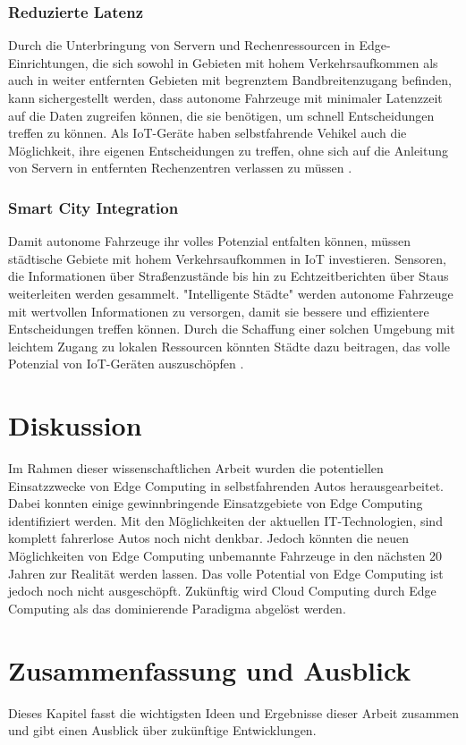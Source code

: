\documentclass{sigchi}
\begin{document}
\subsubsection{Reduzierte Latenz}
Durch die Unterbringung von Servern und Rechenressourcen in Edge-Einrichtungen, die sich sowohl in Gebieten mit hohem Verkehrsaufkommen als auch in weiter entfernten Gebieten mit begrenztem Bandbreitenzugang befinden, kann sichergestellt werden, dass autonome Fahrzeuge mit minimaler Latenzzeit auf die Daten zugreifen können, die sie benötigen, um schnell Entscheidungen treffen zu können. Als IoT-Geräte haben selbstfahrende Vehikel auch die Möglichkeit, ihre eigenen Entscheidungen zu treffen, ohne sich auf die Anleitung von Servern in entfernten Rechenzentren verlassen zu müssen \cite{5-use-cases:2019}.

\subsubsection{Smart City Integration}
Damit autonome Fahrzeuge ihr volles Potenzial entfalten können, müssen städtische Gebiete mit hohem Verkehrsaufkommen in IoT investieren. Sensoren, die Informationen über Straßenzustände bis hin zu Echtzeitberichten über Staus weiterleiten werden gesammelt. "Intelligente Städte" werden autonome Fahrzeuge mit wertvollen Informationen zu versorgen, damit sie bessere und effizientere Entscheidungen treffen können. Durch die Schaffung einer solchen Umgebung mit leichtem Zugang zu lokalen Ressourcen könnten Städte dazu beitragen, das volle Potenzial von IoT-Geräten auszuschöpfen \cite{5-use-cases:2019}.

\section{Diskussion} \label{chap:discussion}
Im Rahmen dieser wissenschaftlichen Arbeit wurden die potentiellen Einsatzzwecke von Edge Computing in selbstfahrenden Autos herausgearbeitet. Dabei konnten einige gewinnbringende Einsatzgebiete von Edge Computing identifiziert werden. Mit den Möglichkeiten der aktuellen IT-Technologien, sind komplett fahrerlose Autos noch nicht denkbar. Jedoch könnten die neuen Möglichkeiten von Edge Computing unbemannte Fahrzeuge in den nächsten 20 Jahren zur Realität werden lassen. Das volle Potential von Edge Computing ist jedoch noch nicht ausgeschöpft. Zukünftig wird Cloud Computing durch Edge Computing als das dominierende Paradigma abgelöst werden.

\section{Zusammenfassung und Ausblick} \label{chap:summary}
Dieses Kapitel fasst die wichtigsten Ideen und Ergebnisse dieser Arbeit zusammen und gibt einen Ausblick über zukünftige Entwicklungen.
\end{document}
